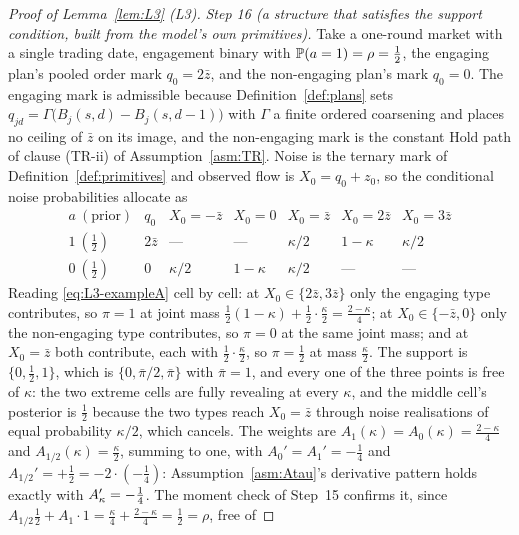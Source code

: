 \begin{proof}[Proof of Lemma~\ref{lem:L3} (L3)]
\emph{Step 16 (a structure that satisfies the support condition, built from the model's own
primitives).} Take a one-round market with a single trading date, engagement binary with
$\mathbb{P}(a=1) = \rho = \tfrac12$, the engaging plan's pooled order mark $q_0 = 2\bar z$, and the
non-engaging plan's mark $q_0 = 0$. The engaging mark is admissible because
Definition~\ref{def:plans} sets $q_{jd} = \Gamma\bigl(B_j(s,d)-B_j(s,d-1)\bigr)$ with $\Gamma$ a
finite ordered coarsening and places no ceiling of $\bar z$ on its image, and the non-engaging mark
is the constant Hold path of clause (TR-ii) of Assumption~\ref{asm:TR}. Noise is the ternary mark of
Definition~\ref{def:primitives} and observed flow is $X_0 = q_0+z_0$, so the conditional noise
probabilities allocate as
\begin{equation}
\label{eq:L3-exampleA}
\begin{array}{c|c|ccccc}
a\ (\text{prior}) & q_0 & X_0 = -\bar z & X_0 = 0 & X_0 = \bar z & X_0 = 2\bar z & X_0 = 3\bar z\\
\hline
1\ (\tfrac12) & 2\bar z & \text{---} & \text{---} & \kappa/2 & 1-\kappa & \kappa/2\\
0\ (\tfrac12) & 0 & \kappa/2 & 1-\kappa & \kappa/2 & \text{---} & \text{---}
\end{array}
\end{equation}
Reading \eqref{eq:L3-exampleA} cell by cell: at $X_0 \in \{2\bar z,3\bar z\}$ only the engaging type
contributes, so $\pi = 1$ at joint mass
$\tfrac12(1-\kappa)+\tfrac12\cdot\tfrac{\kappa}{2} = \tfrac{2-\kappa}{4}$; at
$X_0 \in \{-\bar z,0\}$ only the non-engaging type contributes, so $\pi = 0$ at the same joint mass;
and at $X_0 = \bar z$ both contribute, each with $\tfrac12\cdot\tfrac{\kappa}{2}$, so
$\pi = \tfrac12$ at mass $\tfrac{\kappa}{2}$. The support is $\{0,\tfrac12,1\}$, which is
$\{0,\bar\pi/2,\bar\pi\}$ with $\bar\pi = 1$, and every one of the three points is free of $\kappa$:
the two extreme cells are fully revealing at every $\kappa$, and the middle cell's posterior is
$\tfrac12$ because the two types reach $X_0 = \bar z$ through noise realisations of equal probability
$\kappa/2$, which cancels. The weights are $A_1(\kappa) = A_0(\kappa) = \tfrac{2-\kappa}{4}$ and
$A_{1/2}(\kappa) = \tfrac{\kappa}{2}$, summing to one, with $A_0' = A_1' = -\tfrac14$ and
$A_{1/2}' = +\tfrac12 = -2\cdot(-\tfrac14)$: Assumption~\ref{asm:Atau}'s derivative pattern holds
exactly with $A'_{\kappa} = -\tfrac14$. The moment check of Step~15 confirms it, since
$A_{1/2}\tfrac12+A_1\cdot 1 = \tfrac{\kappa}{4}+\tfrac{2-\kappa}{4} = \tfrac12 = \rho$, free of

\end{proof}
